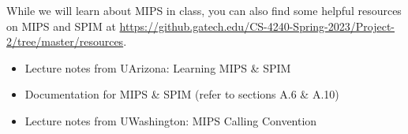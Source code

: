 \documentclass[12pt]{article}
\begin{document}

While we will learn about MIPS in class, you can also find some helpful resources on MIPS and SPIM at \url{https://github.gatech.edu/CS-4240-Spring-2023/Project-2/tree/master/resources}.
\begin{itemize}
    \item Lecture notes from UArizona: Learning MIPS \& SPIM
    \item Documentation for MIPS \& SPIM (refer to sections A.6 \& A.10)
    \item Lecture notes from UWashington: MIPS Calling Convention
\end{itemize}


\end{document}
